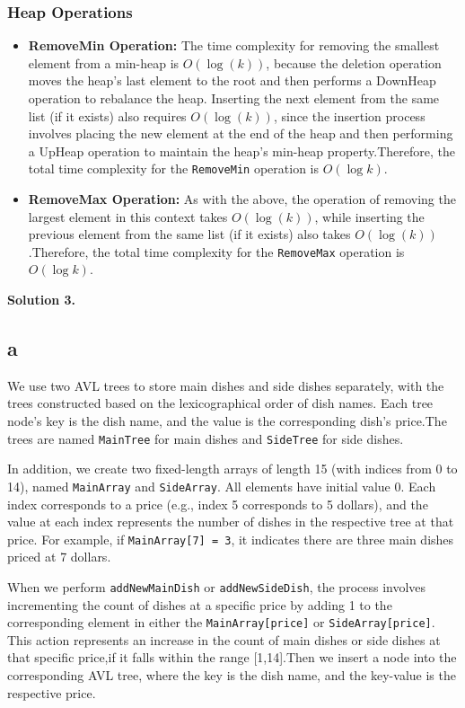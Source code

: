 \documentclass[12pt]{article}
\newcommand{\solution}[1]{\noindent \textbf{Solution #1.}}
\begin{document}
    \subsubsection*{Heap Operations}
    \begin{itemize}
        \item \textbf{RemoveMin Operation:}  The time complexity for removing the smallest element from a min-heap is $O(\log(k))$, because the deletion operation moves the heap's last element to the root and then performs a DownHeap operation to rebalance the heap. Inserting the next element from the same list (if it exists) also requires $O(\log(k))$, since the insertion process involves placing the new element at the end of the heap and then performing a UpHeap operation to maintain the heap's min-heap property.Therefore, the total time complexity for the \texttt{RemoveMin} operation is $O(\log k)$.

        \item \textbf{RemoveMax Operation:} As with the above, the operation of removing the largest element in this context takes $O(\log(k))$, while inserting the previous element from the same list (if it exists) also takes $O(\log(k))$.Therefore, the total time complexity for the \texttt{RemoveMax} operation is $O(\log k)$.
    \end{itemize}

\newpage
\solution{3} 
    \subsection*{a}
        We use two AVL trees to store main dishes and side dishes separately, with the trees constructed based on the lexicographical order of dish names. Each tree node's key is the dish name, and the value is the corresponding dish's price.The trees are named \texttt{MainTree} for main dishes and \texttt{SideTree} for side dishes.

        In addition, we create two fixed-length arrays of length 15 (with indices from 0 to 14), named \texttt{MainArray} and \texttt{SideArray}. All elements have initial value 0. Each index corresponds to a price (e.g., index 5 corresponds to 5 dollars), and the value at each index represents the number of dishes in the respective tree at that price. For example, if \texttt{MainArray[7] = 3}, it indicates there are three main dishes priced at 7 dollars.

        When we perform \texttt{addNewMainDish} or \texttt{addNewSideDish}, the process involves incrementing the count of dishes at a specific price by adding 1 to the corresponding element in either the \texttt{MainArray[price]} or \texttt{SideArray[price]}. This action represents an increase in the count of main dishes or side dishes at that specific price,if it falls within the range [1,14].Then we insert a node into the corresponding AVL tree, where the key is the dish name, and the key-value is the respective price.
\end{document}
